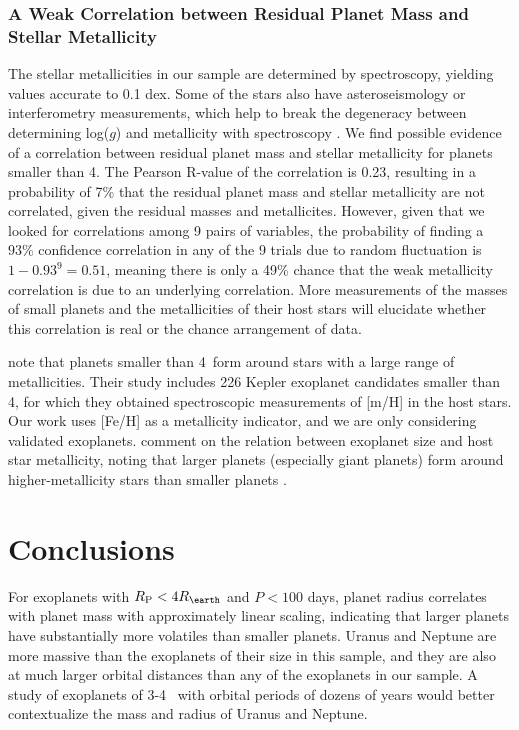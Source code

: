 \documentclass[iop]{emulateapj}
\newcommand{\rspecial}{4 \rearth}
\begin{document}
\subsubsection{A Weak Correlation between Residual Planet Mass and Stellar Metallicity}
The stellar metallicities in our sample are determined by spectroscopy, yielding values accurate to 0.1 dex.  Some of the stars also have asteroseismology or interferometry measurements, which help to break the degeneracy between determining log($g$) and metallicity with spectroscopy \citep{Torres2012}.  We find possible evidence of a correlation between residual planet mass and stellar metallicity for planets smaller than 4\rearth.  The Pearson R-value of the correlation is 0.23, resulting in a probability of 7\% that the residual planet mass and stellar metallicity are not correlated, given the residual masses and metallicites.  However, given that we looked for correlations among 9 pairs of variables, the probability of finding a $93\%$ confidence correlation in any of the 9 trials due to random fluctuation is $1 - 0.93^9 = 0.51$, meaning there is only a 49\% chance that the weak metallicity correlation is due to an underlying correlation.  More measurements of the masses of small planets and the metallicities of their host stars will elucidate whether this correlation is real or the chance arrangement of data.

\citet{Buchhave2012} note that planets smaller than 4\rearth\ form around stars with a large range of metallicities.  Their study includes 226 Kepler exoplanet candidates smaller than 4\rearth, for which they obtained spectroscopic measurements of [m/H] in the host stars.  Our work uses [Fe/H] as a metallicity indicator, and we are only considering validated exoplanets.   \citet{Buchhave2012} comment on the relation between exoplanet size and host star metallicity, noting that larger planets (especially giant planets) form around higher-metallicity stars than smaller planets \citep[see Figure 1 of][]{Buchhave2012}.


\section{Conclusions}
For exoplanets with $\rpl < \rspecial$ and $P < 100$ days, planet radius correlates with planet mass with approximately linear scaling, indicating that larger planets have substantially more volatiles than smaller planets.  Uranus and Neptune are more massive than the exoplanets of their size in this sample, and they are also at much larger orbital distances than any of the exoplanets in our sample.  A study of exoplanets of 3-4 \rearth\ with orbital periods of dozens of years would better contextualize the mass and radius of Uranus and Neptune.
\end{document}
